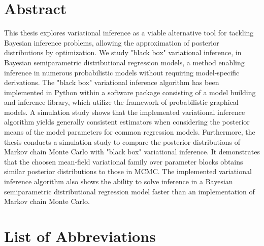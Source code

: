 \clearpage
{}


\section*{Abstract}

This thesis explores variational inference as a viable alternative tool for 
tackling Bayesian inference problems, 
allowing the approximation of posterior distributions by optimization. 
We study "black box" variational inference, in Bayesian semiparametric distributional regression models,
a method enabling inference in numerous probabilistic models without requiring model-specific derivations.
The "black box" variational inference algorithm has been implemented in Python 
within a software package consisting of a model building and inference library, 
which utilize the framework of probabilistic graphical models.
A simulation study shows that the implemented variational inference algorithm yields generally 
consistent estimators when considering the posterior means of the model parameters for common regression models. 
Furthermore, the thesis conducts a simulation study to compare the posterior distributions 
of Markov chain Monte Carlo with "black box" variational inference. It demonstrates that 
the choosen mean-field variational family over parameter blocks obtains similar posterior distributions to those in MCMC.
The implemented variational inference algorithm also shows the ability to solve inference in a
Bayesian semiparametric distributional regression model faster than an implementation of Markov chain Monte Carlo. 

\clearpage

\setcounter{tocdepth}{2}
\tableofcontents
\clearpage

\listoffigures

\listofalgorithms 

\listoftables

\section*{List of Abbreviations}

